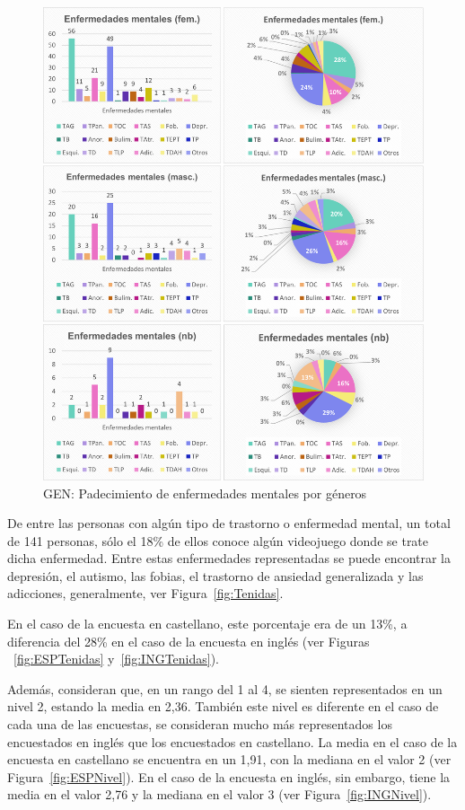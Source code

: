 \documentclass[12pt, a4paper,twoside,titlepage]{book}
\begin{document}
\begin{figure}
\centering
 \includegraphics[width=1\linewidth]{Imagenes Form GEN/Enfermedadesgeneros} 
 \caption{GEN: Padecimiento de enfermedades mentales por géneros}
 \label{fig:Enfgeneros}
 \end{figure}
 

De entre las personas con algún tipo de trastorno o enfermedad mental, un total de 141 personas, sólo el 18\% de ellos conoce algún videojuego donde se trate dicha enfermedad. Entre estas enfermedades representadas se puede encontrar la depresión, el autismo, las fobias, el trastorno de ansiedad generalizada y las adicciones, generalmente, ver Figura~\ref{fig:Tenidas}. 

En el caso de la encuesta en castellano, este porcentaje era de un 13\%, a diferencia del 28\% en el caso de la encuesta en inglés (ver Figuras ~\ref{fig:ESPTenidas} y~\ref{fig:INGTenidas}). 

Además, consideran que, en un rango del 1 al 4, se sienten representados en un nivel 2, estando la media en 2,36. También este nivel es diferente en el caso de cada una de las encuestas, se consideran mucho más representados los encuestados en inglés que los encuestados en castellano. La media en el caso de la encuesta en castellano se encuentra en un 1,91, con la mediana en el valor 2 (ver Figura~\ref{fig:ESPNivel}). En el caso de la encuesta en inglés, sin embargo, tiene la media en el valor 2,76 y la mediana en el valor 3 (ver Figura~\ref{fig:INGNivel}). 
\end{document}
